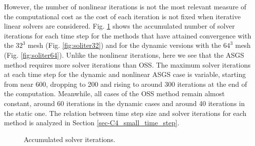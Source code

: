 However, the number of nonlinear iterations is not the most relevant measure of the computational cost as the cost of each iteration is not fixed when iterative linear solvers are considered. Fig. \ref{fig:com_cost_DHIT} shows the accumulated number of solver iterations for each time step for the methods that have attained convergence with the $32^3$ mesh (Fig. \ref{fig:soliter32}) and for the dynamic versions with the $64^3$ mesh (Fig. \ref{fig:soliter64}). 
Unlike the nonlinear iterations, here we see that the ASGS method requires more solver iterations than OSS. The maximum solver iterations at each time step for the dynamic and nonlinear ASGS case is variable, starting from near 600, dropping to 200 and rising to around 300 iterations at the end of the computation. Meanwhile, all cases of the OSS method remain almost constant, around 60 iterations in the dynamic cases and around 40 iterations in the static one. The relation between time step size and solver iterations for each method is analyzed in Section \ref{sec-C4_small_time_step}. %

\begin{figure}[h!]
	\centering	
	\caption{Accumulated solver iterations.}
	\label{fig:com_cost_DHIT}
\end{figure}


